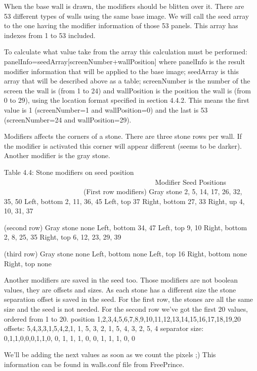  When the base wall is drawn, the modifiers should be blitten over it.
 There are 53 different types of walls using the same base image.
 We will call the seed array to the one having the modifier information of
 those 53 panels. This array has indexes from 1 to 53 included.

 To calculate what value take from the array this calculation must be
 performed: panelInfo=seedArray[screenNumber+wallPosition]
 where panelInfo is the result modifier information that will be applied to
 the base image; seedArray is this array that will be described above as a
 table; screenNumber is the number of the screen the wall is (from 1 to 24)
 and wallPosition is the position the wall is (from 0 to 29), using the
 location format specified in section 4.4.2. This means the first value is
 1 (screenNumber=1 and wallPosition=0) and the last is 53 (screenNumber=24
 and wallPosition=29).

 Modifiers affects the corners of a stone. There are three stone rows per
 wall. If the modifier is activated this corner will appear different
 (seems to be darker). Another modifier is the gray stone.

                   Table 4.4: Stone modifiers on seed position
                   ~~~~~~~~~~~~~~~~~~~~~~~~~~~~~~~~~~~~~~~~~~~
  Modifier       Seed Positions
  ~~~~~~~~       ~~~~ ~~~~~~~~~
     (First row modifiers)
  Gray stone     2, 5, 14, 17, 26, 32, 35, 50
  Left, bottom   2, 11, 36, 45
  Left, top      37
  Right, bottom  27, 33
  Right, up      4, 10, 31, 37

     (second row)
  Gray stone     none 
  Left, bottom   34, 47
  Left, top      9, 10
  Right, bottom  2, 8, 25, 35
  Right, top     6, 12, 23, 29, 39

     (third row)
  Gray stone     none 
  Left, bottom   none
  Left, top      16
  Right, bottom  none
  Right, top     none

 Another modifiers are saved in the seed too. Those modifiers are not
 boolean values, they are offsets and sizes. As each stone has a different
 size the stone separation offset is saved in the seed.
 For the first row, the stones are all the same size and the seed is not
 needed.
 For the second row we've got the first 20 values, ordered from 1 to 20. 
 position        1,2,3,4,5,6,7,8,9,10,11,12,13,14,15,16,17,18,19,20
 offsets:        5,4,3,3,1,5,4,2,1, 1, 5, 3, 2, 1, 5, 4, 3, 2, 5, 4
 separator size: 0,1,1,0,0,0,1,1,0, 0, 1, 1, 1, 0, 0, 1, 1, 1, 0, 0

 We'll be adding the next values as soon as we count the pixels ;)
 This information can be found in walls.conf file from FreePrince.

